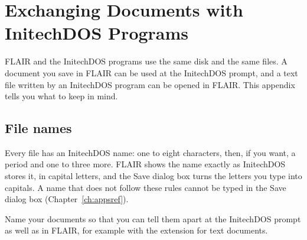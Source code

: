 \chapter{Exchanging Documents with InitechDOS Programs}
\label{apx:exchange}

FLAIR and the InitechDOS programs use the same disk and the same files.  A
document you save in FLAIR can be used at the InitechDOS prompt, and a text
file written by an InitechDOS program can be opened in FLAIR.  This
appendix tells you what to keep in mind.

\section{File names}
Every file has an InitechDOS name: one to eight characters, then, if you
want, a period and one to three more.  FLAIR shows the name exactly as
InitechDOS stores it, in capital letters, and the Save dialog box turns the
letters you type into capitals.  A name that does not follow these rules
cannot be typed in the Save dialog box (Chapter~\ref{ch:appsref}).

Name your documents so that you can tell them apart at the InitechDOS
prompt as well as in FLAIR, for example with the extension  for
text documents.


